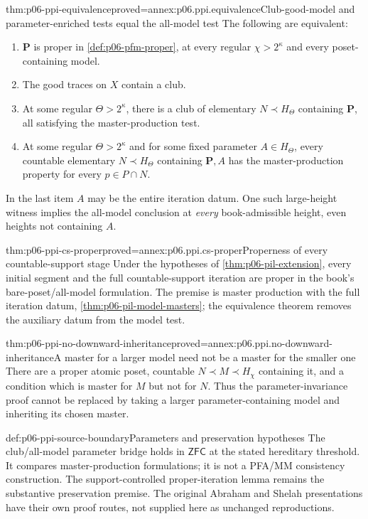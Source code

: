 \begin{hbtheorem}{thm:p06-ppi-equivalence}{proved=annex:p06.ppi.equivalence}{Club-good-model and parameter-enriched tests equal the all-model test}
The following are equivalent:
\begin{enumerate}
\item \(\mathbf P\) is proper in \cref{def:p06-pfm-proper}, at every
      regular \(\chi>2^\kappa\) and every poset-containing model.
\item The good traces on \(X\) contain a club.
\item At some regular \(\Theta>2^\kappa\), there is a club
      of elementary \(N\prec H_\Theta\) containing \(\mathbf P\),
      all satisfying the master-production test.
\item At some regular \(\Theta>2^\kappa\) and for some
      fixed parameter \(A\in H_\Theta\), every countable elementary
      \(N\prec H_\Theta\) containing \(\mathbf P,A\) has the
      master-production property for every \(p\in P\cap N\).
\end{enumerate}
In the last item \(A\) may be the entire iteration datum. One such
large-height witness implies the all-model conclusion at \emph{every}
book-admissible height, even heights not containing \(A\).
\end{hbtheorem}

\begin{hbcorollary}{thm:p06-ppi-cs-proper}{proved=annex:p06.ppi.cs-proper}{Properness of every countable-support stage}
Under the hypotheses of \cref{thm:p06-pil-extension}, every initial
segment and the full countable-support iteration are proper in the
book's bare-poset/all-model formulation. The premise is master production
with the full iteration datum, \cref{thm:p06-pil-model-masters}; the
equivalence theorem removes the auxiliary datum from the model test.
\end{hbcorollary}

\begin{hbtheorem}{thm:p06-ppi-no-downward-inheritance}{proved=annex:p06.ppi.no-downward-inheritance}{A master for a larger model need not be a master for the smaller one}
There are a proper atomic poset, countable \(N\prec M\prec H_\chi\)
containing it, and a condition which is master for \(M\) but not for
\(N\). Thus the parameter-invariance proof cannot be replaced by taking
a larger parameter-containing model and inheriting its chosen master.
\end{hbtheorem}

\begin{proofboundary}{def:p06-ppi-source-boundary}{Parameters and preservation hypotheses}
The club/all-model parameter bridge holds in \(\mathsf{ZFC}\) at the
stated hereditary threshold. It compares master-production formulations;
it is not a PFA/MM consistency construction. The support-controlled
proper-iteration lemma remains the substantive preservation premise.
The original Abraham and Shelah presentations have their own proof
routes, not supplied here as unchanged reproductions.
\end{proofboundary}
